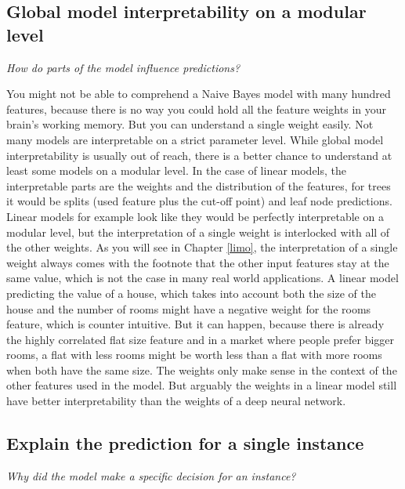 \documentclass[12pt,]{krantz}
\theoremstyle{definition}
\theoremstyle{definition}
\theoremstyle{definition}
\theoremstyle{remark}
\begin{document}
\subsection{Global model interpretability on a modular
level}\label{global-model-interpretability-on-a-modular-level}

\emph{How do parts of the model influence predictions?}

You might not be able to comprehend a Naive Bayes model with many
hundred features, because there is no way you could hold all the feature
weights in your brain's working memory. But you can understand a single
weight easily. Not many models are interpretable on a strict parameter
level. While global model interpretability is usually out of reach,
there is a better chance to understand at least some models on a modular
level. In the case of linear models, the interpretable parts are the
weights and the distribution of the features, for trees it would be
splits (used feature plus the cut-off point) and leaf node predictions.
Linear models for example look like they would be perfectly
interpretable on a modular level, but the interpretation of a single
weight is interlocked with all of the other weights. As you will see in
Chapter \ref{limo}, the interpretation of a single weight always comes
with the footnote that the other input features stay at the same value,
which is not the case in many real world applications. A linear model
predicting the value of a house, which takes into account both the size
of the house and the number of rooms might have a negative weight for
the rooms feature, which is counter intuitive. But it can happen,
because there is already the highly correlated flat size feature and in
a market where people prefer bigger rooms, a flat with less rooms might
be worth less than a flat with more rooms when both have the same size.
The weights only make sense in the context of the other features used in
the model. But arguably the weights in a linear model still have better
interpretability than the weights of a deep neural network.

\subsection{Explain the prediction for a single
instance}\label{explain-the-prediction-for-a-single-instance}

\emph{Why did the model make a specific decision for an instance?}
\end{document}
